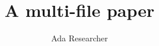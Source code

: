 \documentclass{pilot}
\begin{document}
\title{A multi-file paper}
\author{Ada Researcher}
\maketitle
\tableofcontents




\end{document}
